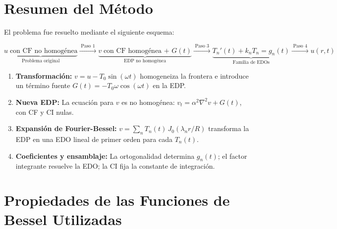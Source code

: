 \documentclass[12pt, a4paper]{article}
\begin{document}
\section{Resumen del Método}

El problema fue resuelto mediante el siguiente esquema:

\begin{center}
\begin{tcolorbox}[
  enhanced,
  colback=grisclaro,
  colframe=azulprimario,
  arc=3mm, boxrule=0.6pt,
  width=0.92\textwidth
]
\[
  \underbrace{u\;\text{con CF no homogénea}}_{\text{Problema original}}
  \xrightarrow{\;\text{Paso 1}\;}
  \underbrace{v\;\text{con CF homogénea + }G(t)}_{\text{EDP no homogénea}}
  \xrightarrow{\;\text{Paso 3}\;}
  \underbrace{T_n'(t) + k_n T_n = g_n(t)}_{\text{Familia de EDOs}}
  \xrightarrow{\;\text{Paso 4}\;}
  u(r,t)
\]
\end{tcolorbox}
\end{center}

\begin{enumerate}[leftmargin=2.5em, label=\textbf{Paso \arabic*.}]
  \item \textbf{Transformación:} $v = u - T_0\sin(\omega t)$ homogeneiza la frontera
        e introduce un término fuente $G(t) = -T_0\omega\cos(\omega t)$ en la EDP.

  \item \textbf{Nueva EDP:} La ecuación para $v$ es no homogénea:
        $v_t = \alpha^2\nabla^2 v + G(t)$, con CF y CI nulas.

  \item \textbf{Expansión de Fourier-Bessel:} $v = \sum_n T_n(t)\,J_0(\lambda_n r/R)$
        transforma la EDP en una EDO lineal de primer orden para cada $T_n(t)$.

  \item \textbf{Coeficientes y ensamblaje:} La ortogonalidad determina $g_n(t)$;
        el factor integrante resuelve la EDO; la CI fija la constante de integración.
\end{enumerate}

\appendix
\section{Propiedades de las Funciones de Bessel Utilizadas}
\end{document}
